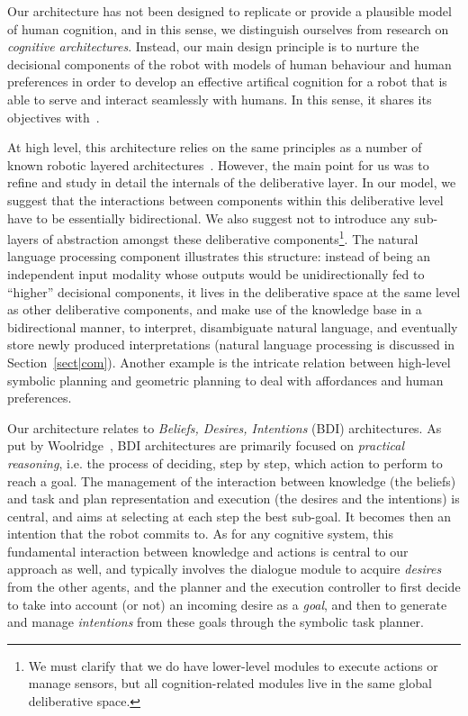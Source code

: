 \documentclass[preprint,3p,times]{elsarticle}
\newcommand{\ie}{i.e.\xspace}
\begin{document}
Our architecture has not been designed to replicate or provide a
plausible model of human cognition, and in this sense, we distinguish ourselves
from research on \emph{cognitive architectures}. Instead, our main design
principle is to nurture the decisional components of the robot with models of human
behaviour and human preferences in order to develop an effective artifical
cognition for a robot that is able to serve and interact seamlessly with
humans. In this sense, it shares its objectives with~\cite{Fong2005,trafton2013act}.

At high level, this architecture relies on the same principles as a number of
known robotic layered architectures~\cite{Alami98,Gat1998three,Volpe2001CLARAty,
Goldberg2002}. However, the main point for us was to refine and study in detail
the internals of the deliberative layer. In our model, we suggest that the interactions
between components within this deliberative level have to be essentially
bidirectional. We also suggest not to introduce any sub-layers of abstraction amongst these deliberative
components\footnote{We must clarify that we do have lower-level modules to execute actions or manage
sensors, but all cognition-related modules live in the same global deliberative
space.}. The natural language processing component illustrates this structure:
instead of being an independent input modality whose outputs would be
unidirectionally fed to ``higher'' decisional components, it lives in the
deliberative space at the same level as other deliberative components, and make
use of the knowledge base in a bidirectional manner, to interpret, disambiguate natural
language, and eventually store newly produced interpretations (natural language
processing is discussed in Section~\ref{sect|com}). Another example is the
intricate relation between high-level symbolic planning and geometric planning
to deal with affordances and human preferences.

Our architecture relates to \emph{Beliefs, Desires, Intentions} (BDI)
architectures. As put by Woolridge~\cite{Woolridge1999}, BDI architectures are
primarily focused on \emph{practical reasoning}, \ie the process of deciding,
step by step, which action to perform to reach a goal. The management of the
interaction between knowledge (the beliefs) and task and plan representation and
execution (the desires and the intentions) is central, and aims at selecting at
each step the best sub-goal. It becomes then an intention that the robot commits
to. As for any cognitive system, this fundamental interaction between knowledge and
actions is central to our approach as well, and typically involves the dialogue
module to acquire \emph{desires} from the other agents, and the planner and the
execution controller to first decide to take into account (or not) an
incoming desire as a \emph{goal}, and then to generate and manage
\emph{intentions} from these goals through the symbolic task planner.
\end{document}
